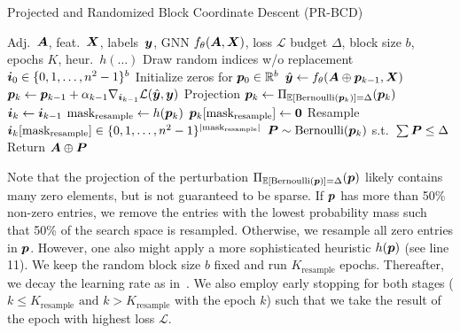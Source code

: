 \documentclass[sigconf, review]{acmart}
\newcommand{\adj}{\mA}
\newcommand{\features}{\mX}
\begin{document}

\begin{algorithm}[h]
  \small
  \caption{Projected and Randomized Block Coordinate Descent (PR-BCD)}
  \label{algo:prbcd}
  \begin{algorithmic}[1]
     Adj.\ \(\adj\), feat.\ \(\features\), labels\ \({\bm{y}}\), GNN \(f_{\theta}(\adj, \features)\), loss \(\mathcal{L}\)
     budget \(\Delta\), block size \(b\), epochs \(K\), heur.\ \(h(\dots)\)
    \STATE Draw random indices w/o replacement \({\bm{i}}_0 \in \{0, 1, \dots, n^2 - 1\}^b\)
    \STATE Initialize zeros for \({\bm{p}}_0 \in \mathbb{R}^b\)
    \STATE \(\hat{\vy} \leftarrow f_{\theta}(\adj \oplus \vp_{k-1}, \features)\)
    \STATE \({\bm{p}}_{k} \leftarrow {\bm{p}}_{k-1} + \alpha_{k-1} \nabla_{{\bm{i}}_{k-1}} \mathcal{L}(\hat{{\bm{y}}}, {\bm{y}})\)
    \STATE Projection \({\bm{p}}_{k} \leftarrow \Pi_{\mathbb{E}[\text{Bernoulli}({\bm{p}}_k)] = \Delta} ({\bm{p}}_{k})\)
    \STATE \({\bm{i}}_{k} \leftarrow {\bm{i}}_{k-1}\)
    \STATE \(\text{mask}_{\text{resample}} \leftarrow h({\bm{p}}_{k})\)
    \STATE \({\bm{p}}_k[\text{mask}_{\text{resample}}] \leftarrow \mathbf{0}\)
    \STATE Resample \({\bm{i}}_{k}[\text{mask}_{\text{resample}}] \in \{0, 1, \dots, n^2 - 1\}^{|\text{mask}_{\text{resample}}|}\)
    \ENDIF
    \ENDFOR
    \STATE \({\bm{P}} \sim \text{Bernoulli}({\bm{p}}_{k})\) s.t.\ \(\sum {\bm{P}} \le \Delta\)
    \STATE Return \(\adj \oplus \mP\)
  \end{algorithmic}
\end{algorithm}


Note that the projection of the perturbation \(\Pi_{\mathbb{E}[\text{Bernoulli}({\bm{p}})] = \Delta} ({\bm{p}})\) likely contains many zero elements, but is not guaranteed to be sparse. If \({\bm{p}}\) has more than 50\% non-zero entries, we remove the entries with the lowest probability mass such that 50\% of the search space is resampled. Otherwise, we resample all zero entries in \({\bm{p}}\). However, one also might apply a more sophisticated heuristic \(h({\bm{p}})\) (see line 11). We keep the random block size \(b\) fixed and run \(K_{\text{resample}}\) epochs. Thereafter, we decay the learning rate as in~\cite{Xu2019a}. We also employ early stopping for both stages (\(k \le K_{\text{resample}} \text{ and } k > K_{\text{resample}}\) with the epoch \(k\)) such that we take the result of the epoch with highest loss \(\mathcal{L}\).
\end{document}
